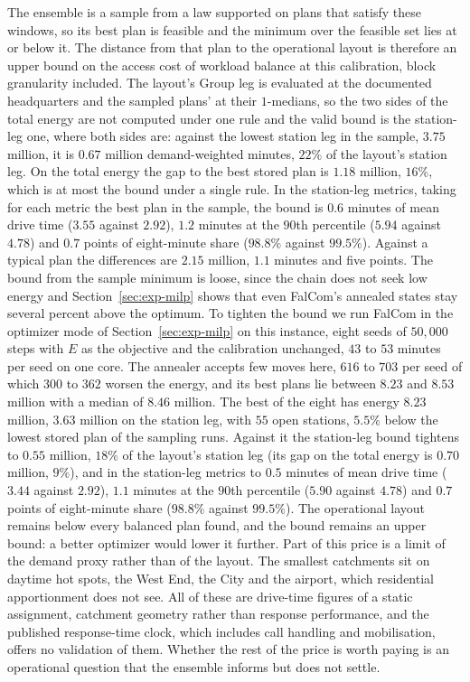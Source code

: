 \documentclass[preprint,12pt,authoryear]{elsarticle}
\theoremstyle{definition}
\begin{document}
The ensemble is a sample from a law supported on plans that satisfy these windows, so its best plan is feasible and the minimum over the feasible set lies at or below it. The distance from that plan to the operational layout is therefore an upper bound on the access cost of workload balance at this calibration, block granularity included. The layout's Group leg is evaluated at the documented headquarters and the sampled plans' at their $1$-medians, so the two sides of the total energy are not computed under one rule and the valid bound is the station-leg one, where both sides are: against the lowest station leg in the sample, $3.75$ million, it is $0.67$ million demand-weighted minutes, $22\%$ of the layout's station leg. On the total energy the gap to the best stored plan is $1.18$ million, $16\%$, which is at most the bound under a single rule. In the station-leg metrics, taking for each metric the best plan in the sample, the bound is $0.6$ minutes of mean drive time ($3.55$ against $2.92$), $1.2$ minutes at the $90$th percentile ($5.94$ against $4.78$) and $0.7$ points of eight-minute share ($98.8\%$ against $99.5\%$). Against a typical plan the differences are $2.15$ million, $1.1$ minutes and five points. The bound from the sample minimum is loose, since the chain does not seek low energy and Section~\ref{sec:exp-milp} shows that even FalCom's annealed states stay several percent above the optimum. To tighten the bound we run FalCom in the optimizer mode of Section~\ref{sec:exp-milp} on this instance, eight seeds of $50{,}000$ steps with $E$ as the objective and the calibration unchanged, $43$ to $53$ minutes per seed on one core. The annealer accepts few moves here, $616$ to $703$ per seed of which $300$ to $362$ worsen the energy, and its best plans lie between $8.23$ and $8.53$ million with a median of $8.46$ million. The best of the eight has energy $8.23$ million, $3.63$ million on the station leg, with $55$ open stations, $5.5\%$ below the lowest stored plan of the sampling runs. Against it the station-leg bound tightens to $0.55$ million, $18\%$ of the layout's station leg (its gap on the total energy is $0.70$ million, $9\%$), and in the station-leg metrics to $0.5$ minutes of mean drive time ($3.44$ against $2.92$), $1.1$ minutes at the $90$th percentile ($5.90$ against $4.78$) and $0.7$ points of eight-minute share ($98.8\%$ against $99.5\%$). The operational layout remains below every balanced plan found, and the bound remains an upper bound: a better optimizer would lower it further.
Part of this price is a limit of the demand proxy rather than of the layout. The smallest catchments sit on daytime hot spots, the West End, the City and the airport, which residential apportionment does not see. All of these are drive-time figures of a static assignment, catchment geometry rather than response performance, and the published response-time clock, which includes call handling and mobilisation, offers no validation of them. Whether the rest of the price is worth paying is an operational question that the ensemble informs but does not settle.
\end{document}
